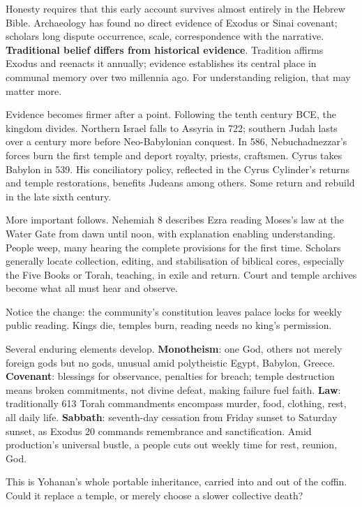 Honesty requires that this early account survives almost entirely in the Hebrew Bible. Archaeology has found no direct evidence of Exodus or Sinai covenant; scholars long dispute occurrence, scale, correspondence with the narrative. \textbf{Traditional belief differs from historical evidence}. Tradition affirms Exodus and reenacts it annually; evidence establishes its central place in communal memory over two millennia ago. For understanding religion, that may matter more.

Evidence becomes firmer after a point. Following the tenth century BCE, the kingdom divides. Northern Israel falls to Assyria in 722; southern Judah lasts over a century more before Neo-Babylonian conquest. In 586, Nebuchadnezzar's forces burn the first temple and deport royalty, priests, craftsmen. Cyrus takes Babylon in 539. His conciliatory policy, reflected in the Cyrus Cylinder's returns and temple restorations, benefits Judeans among others. Some return and rebuild in the late sixth century.

More important follows. Nehemiah 8 describes Ezra reading Moses's law at the Water Gate from dawn until noon, with explanation enabling understanding. People weep, many hearing the complete provisions for the first time. Scholars generally locate collection, editing, and stabilisation of biblical cores, especially the Five Books or Torah, teaching, in exile and return. Court and temple archives become what all must hear and observe.

Notice the change: the community's constitution leaves palace locks for weekly public reading. Kings die, temples burn, reading needs no king's permission.

Several enduring elements develop. \textbf{Monotheism}: one God, others not merely foreign gods but no gods, unusual amid polytheistic Egypt, Babylon, Greece. \textbf{Covenant}: blessings for observance, penalties for breach; temple destruction means broken commitments, not divine defeat, making failure fuel faith. \textbf{Law}: traditionally 613 Torah commandments encompass murder, food, clothing, rest, all daily life. \textbf{Sabbath}: seventh-day cessation from Friday sunset to Saturday sunset, as Exodus 20 commands remembrance and sanctification. Amid production's universal bustle, a people cuts out weekly time for rest, reunion, God.

This is Yohanan's whole portable inheritance, carried into and out of the coffin. Could it replace a temple, or merely choose a slower collective death?

